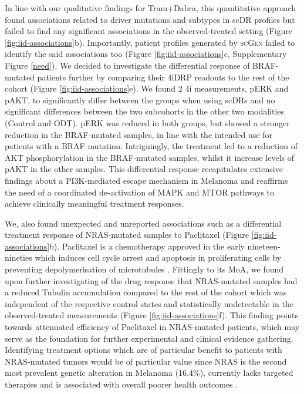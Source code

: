 In line with our qualitative findings for Tram+Dabra, this quantitative approach found associations related to driver mutations and subtypes in scDR profiles but failed to find any significant associations in the observed-treated setting (Figure \ref{fig:iid-associations}b).
 Importantly, patient profiles generated by \textsc{scGen} failed to identify the said associations too (Figure \ref{fig:iid-associations}c, Supplementary Figure \ref{need}).
 We decided to investigate the differential response of BRAF-mutated patients further by comparing their 4iDRP readouts to the rest of the cohort (Figure \ref{fig:iid-associations}e).
 We found 2 4i measurements, pERK and pAKT, to significantly differ between the groups when using scDRs and no significant differences between the two subcohorts in the other two modalities (Control and ODT).
 pERK was reduced in both groups, but showed a stronger reduction in the BRAF-mutated samples, in line with the intended use for patients with a BRAF mutation.
 Intriguingly, the treatment led to a reduction of AKT phosphorylation in the BRAF-mutated samples, whilst it increase levels of pAKT in the other samples.
 This differential response recapitulates extensive findings about a PI3K-mediated escape mechanism in Melanoma \cite{penna2015,irvine2018} and reaffirms the need of a coordinated de-activation of MAPK and MTOR pathways to achieve clinically meaningful treatment responses. 

We, also found unexpected and unreported associations such as a differential treatment response of NRAS-mutated samples to Paclitaxel (Figure \ref{fig:iid-associations}b).
 Paclitaxel is a chemotherapy approved in the early nineteen-nineties which induces cell cycle arrest and apoptosis in proliferating cells by preventing depolymerisation of microtubules \cite{panchagnula1998}.
 Fittingly to its MoA, we found upon further investigating of the drug response that NRAS-mutated samples had a reduced Tubulin accumulation compared to the rest of the cohort which was independent of the respective control states and statistically undetectable in the observed-treated measurements (Figure \ref{fig:iid-associations}f).
 This finding points towards attenuated efficiency of Paclitaxel in NRAS-mutated patients, which may serve as the foundation for further experimental and clinical evidence gathering.
 Identifying treatment options which are of particular benefit to patients with NRAS-mutated tumors would be of particular value since NRAS is the second most prevalent genetic alteration in Melanoma (16.4\%), currently lacks targeted therapies and is associated with overall poorer health outcomes \cite{gutierrez-castaneda2020}. 

